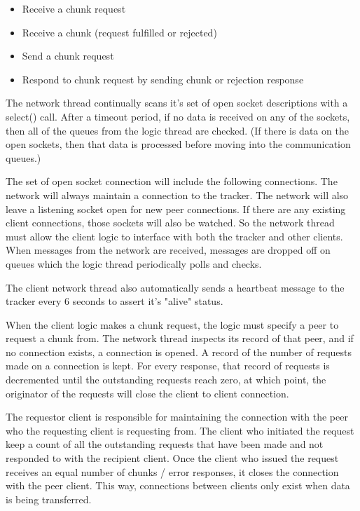 \begin{itemize}
	\item Receive a chunk request
	\item Receive a chunk (request fulfilled or rejected)
\end{itemize}


\begin{itemize}
	\item Send a chunk request
	\item Respond to chunk request by sending chunk or rejection response
\end{itemize}

The network thread continually scans it's set of open socket descriptions with a select() call. After a timeout period, if no data is received on any of the sockets, then all of the queues from the logic thread are checked. (If there is data on the open sockets, then that data is processed before moving into the communication queues.)

The set of open socket connection will include the following connections. The network will always maintain a connection to the tracker. The network will also leave a listening socket open for new peer connections. If there are any existing client connections, those sockets will also be watched. So the network thread must allow the client logic to interface with both the tracker and other clients. When messages from the network are received, messages are dropped off on queues which the logic thread periodically polls and checks. 

The client network thread also automatically sends a heartbeat message to the tracker every 6 seconds to assert it's "alive" status.

When the client logic makes a chunk request, the logic must specify a peer to request a chunk from. The network thread inspects its record of that peer, and if no connection exists, a connection is opened. A record of the number of requests made on a connection is kept. For every response, that record of requests is decremented until the outstanding requests reach zero, at which point, the originator of the requests will close the client to client connection.

The requestor client is responsible for maintaining the connection with the peer who the requesting client is requesting from. The client who initiated the request keep a count of all the outstanding requests that have been made and not responded to with the recipient client. Once the client who issued the request receives an equal number of chunks / error responses, it closes the connection with the peer client. This way, connections between clients only exist when data is being transferred.

